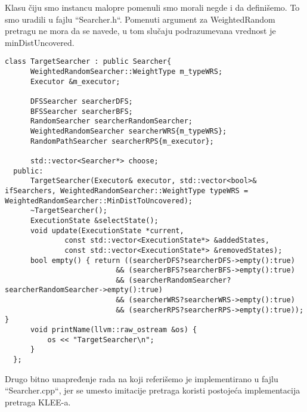 \documentclass[a4paper]{article}
\begin{document}
Klasu čiju smo instancu malopre pomenuli smo morali negde i da definišemo. To smo uradili u fajlu ``Searcher.h``. Pomenuti argument za WeightedRandom pretragu ne mora da se navede, u tom slučaju podrazumevana vrednost je minDistUncovered. 
\begin{lstlisting}[title={TargetSearcher klasa}, label={lst:kod}]
class TargetSearcher : public Searcher{
      WeightedRandomSearcher::WeightType m_typeWRS;
      Executor &m_executor;
      
      DFSSearcher searcherDFS;
      BFSSearcher searcherBFS;
      RandomSearcher searcherRandomSearcher;
      WeightedRandomSearcher searcherWRS{m_typeWRS};
      RandomPathSearcher searcherRPS{m_executor};
      
      std::vector<Searcher*> choose;
  public:
      TargetSearcher(Executor& executor, std::vector<bool>& ifSearchers, WeightedRandomSearcher::WeightType typeWRS = WeightedRandomSearcher::MinDistToUncovered);
      ~TargetSearcher();
	  ExecutionState &selectState();
	  void update(ExecutionState *current,
			  const std::vector<ExecutionState*> &addedStates,
			  const std::vector<ExecutionState*> &removedStates);
	  bool empty() { return ((searcherDFS?searcherDFS->empty():true) 
                          && (searcherBFS?searcherBFS->empty():true) 
                          && (searcherRandomSearcher?searcherRandomSearcher->empty():true) 
                          && (searcherWRS?searcherWRS->empty():true) 
                          && (searcherRPS?searcherRPS->empty():true)); }
	  void printName(llvm::raw_ostream &os) {
		  os << "TargetSearcher\n";
	  }
  };
\end{lstlisting}

Drugo bitno unapređenje rada na koji referišemo je implementirano u fajlu ``Searcher.cpp``, jer se umesto imitacije pretraga koristi postojeća implementacija pretraga KLEE-a. 
\end{document}
